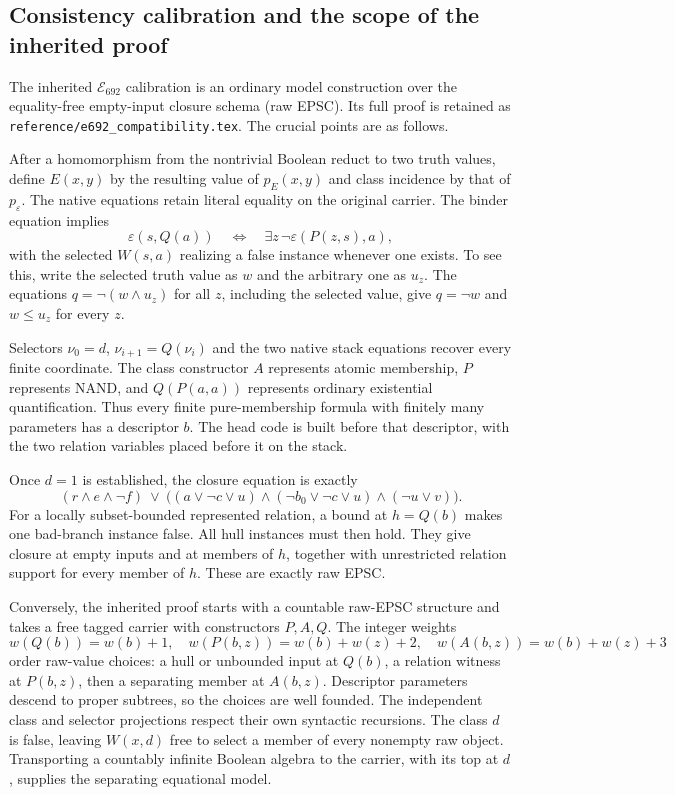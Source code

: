 \subsection{Consistency calibration and the scope of the inherited proof}

The inherited $\mathcal E_{692}$ calibration is an ordinary model
construction over the equality-free empty-input closure schema
(raw EPSC).  Its full proof is retained as
\texttt{reference/e692\_compatibility.tex}.  The crucial points are
as follows.

After a homomorphism from the nontrivial Boolean reduct to two
truth values, define $E(x,y)$ by the resulting value of $p_E(x,y)$
and class incidence by that of $p_\varepsilon$.
The native equations retain literal equality on the original carrier.
The binder equation implies
\[
 \varepsilon(s,Q(a))\quad\Longleftrightarrow\quad
        \exists z\,\neg\varepsilon(P(z,s),a),
\]
with the selected $W(s,a)$ realizing a false instance whenever
one exists.  To see this, write the selected truth value as $w$
and the arbitrary one as $u_z$.  The equations
$q=\neg(w\wedge u_z)$ for all $z$, including the selected value,
give $q=\neg w$ and $w\leq u_z$ for every $z$.

Selectors $\nu_0=d$, $\nu_{i+1}=Q(\nu_i)$ and the two native
stack equations recover every finite coordinate.  The class constructor
$A$ represents atomic membership, $P$ represents NAND, and
$Q(P(a,a))$ represents ordinary existential quantification.
Thus every finite pure-membership formula with finitely many parameters
has a descriptor $b$.  The head code is built before that descriptor,
with the two relation variables placed before it on the stack.

Once $d=1$ is established, the closure equation is exactly
\[
 (r\wedge e\wedge\neg f)
 \ \lor\
 \bigl((a\lor\neg c\lor u)
       \wedge(\neg b_0\lor\neg c\lor u)
       \wedge(\neg u\lor v)\bigr).
\]
For a locally subset-bounded represented relation, a bound at $h=Q(b)$
makes one bad-branch instance false.  All hull instances must then hold.
They give closure at empty inputs and at members of $h$, together
with unrestricted relation support for every member of $h$.
These are exactly raw EPSC.

Conversely, the inherited proof starts with a countable raw-EPSC
structure and takes a free tagged carrier with constructors $P,A,Q$.
The integer weights
\[
 w(Q(b))=w(b)+1,\quad
 w(P(b,z))=w(b)+w(z)+2,\quad
 w(A(b,z))=w(b)+w(z)+3
\]
order raw-value choices: a hull or unbounded input at $Q(b)$,
a relation witness at $P(b,z)$, then a separating member at $A(b,z)$.
Descriptor parameters descend to proper subtrees, so the choices
are well founded.  The independent class and selector projections
respect their own syntactic recursions.  The class $d$ is false,
leaving $W(x,d)$ free to select a member of every nonempty raw object.
Transporting a countably infinite Boolean algebra to the carrier,
with its top at $d$, supplies the separating equational model.

